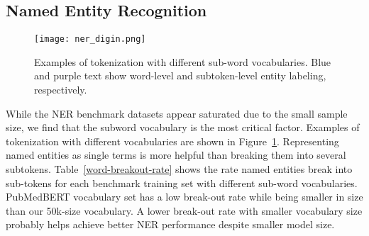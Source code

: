 \documentclass[11pt,a4paper]{article}
\begin{document}
\begin{table*}[ht!]
\centering
{}
\caption{\label{final-evaluation-qa}Evaluation results on QA after fine-tuning for 30 epochs on checkpoints fine-tuned on SQuAD dataset with fixed hyper-parameter settings as \texttt{num-fc-layers}: 2; \texttt{fc-hidden-size}: 2048; \texttt{fc-dropout}: 0.1; \texttt{max-seq-length}: 512; \texttt{learning-rate}: 3e-5; cross-entropy loss, using Adam optimizer. BioMegatron models are pre-trained from scratch on PubMed, except 1.2b model which is fine-tuned from a general domain model checkpoint.}
\end{table*}



\subsection{Named Entity Recognition}

\begin{figure}[h]
\centering
\texttt{[image: ner\_digin.png]}
\caption{Examples of tokenization with different sub-word vocabularies. Blue and purple text show word-level and subtoken-level entity labeling, respectively.}
\label{fig:ner_digin}
\end{figure}

While the NER benchmark datasets appear saturated due to the small sample size, we find that the subword vocabulary is the most critical factor.
Examples of tokenization with different vocabularies are shown in Figure~\ref{fig:ner_digin}.
Representing named entities as single terms is more helpful than breaking them into several subtokens.
Table~\ref{word-breakout-rate} shows the rate named entities break into sub-tokens for each benchmark training set with different sub-word vocabularies.
PubMedBERT vocabulary set has a low break-out rate while being smaller in size than our 50k-size vocabulary.
A lower break-out rate with smaller vocabulary size probably helps achieve better NER performance despite smaller model size.
\end{document}
